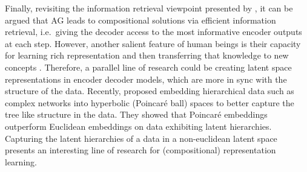 Finally, revisiting the information retrieval viewpoint presented by \cite{Vaswani2017}, it can be argued that AG leads to compositional solutions via efficient information retrieval,  i.e.\ giving the decoder access to the most informative encoder outputs at each step. However, another salient feature of human beings is their capacity for learning rich representation and then transferring that knowledge to new concepts \citep{Lake2015}. Therefore, a parallel line of research could be creating latent space representations in encoder decoder models,  which are more in sync with the structure of the data. Recently, \cite{Nickel2017} proposed embedding hierarchical data such as complex networks into hyperbolic (Poincar\'e ball) spaces to better capture the tree like structure in the data. They showed that Poincar\'e embeddings outperform Euclidean embeddings on data exhibiting latent hierarchies. Capturing the latent hierarchies of a data in a non-euclidean latent space presents an interesting line of research for (compositional) representation learning.
